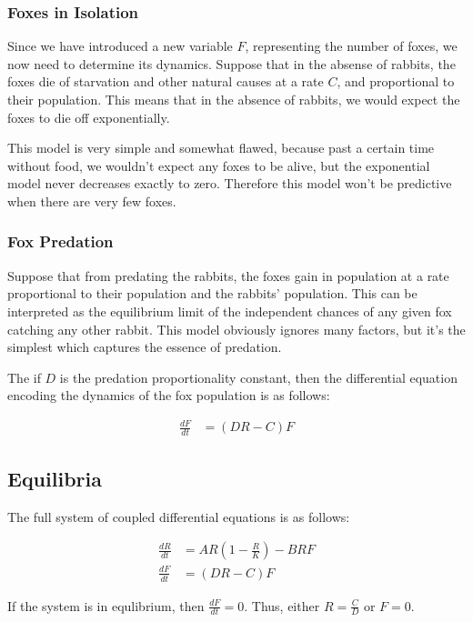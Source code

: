 \documentclass{article}
\begin{document}
\subsubsection{Foxes in Isolation}

Since we have introduced a new variable $F$, representing the number
	of foxes, we now need to determine its dynamics.
Suppose that in the absense of rabbits, the foxes die of starvation
	and other natural causes at a rate $C$, and proportional to their
	population.
This means that in the absence of rabbits, we would expect the foxes
	to die off exponentially.

This model is very simple and somewhat flawed, because past a certain
	time without food, we wouldn't expect any foxes to be alive,
	but the exponential model never decreases exactly to zero.
Therefore this model won't be predictive when there are very few
	foxes.

\subsubsection{Fox Predation}

Suppose that from predating the rabbits, the foxes gain in population
	at a rate proportional to their population and the rabbits' population.
This can be interpreted as the equilibrium limit of the independent
	chances of any given fox catching any other rabbit.
This model obviously ignores many factors, but it's the simplest which
	captures the essence of predation.

The if $D$ is the predation proportionality constant, then the differential
	equation encoding the dynamics of the fox population
	is as follows:

\begin{align}
	\frac{dF}{dt} & = \left( D R - C \right) F
\end{align}

\subsection{Equilibria}

The full system of coupled differential equations is as follows:

\begin{align}
	\frac{dR}{dt} & = A R \left( 1 - \frac{R}{K} \right) - B R F\\
	\frac{dF}{dt} & = \left( D R - C \right) F
\end{align}

If the system is in equlibrium, then $\frac{dF}{dt} = 0$.
Thus, either $R = \frac{C}{D}$ or $F = 0$.
\end{document}
